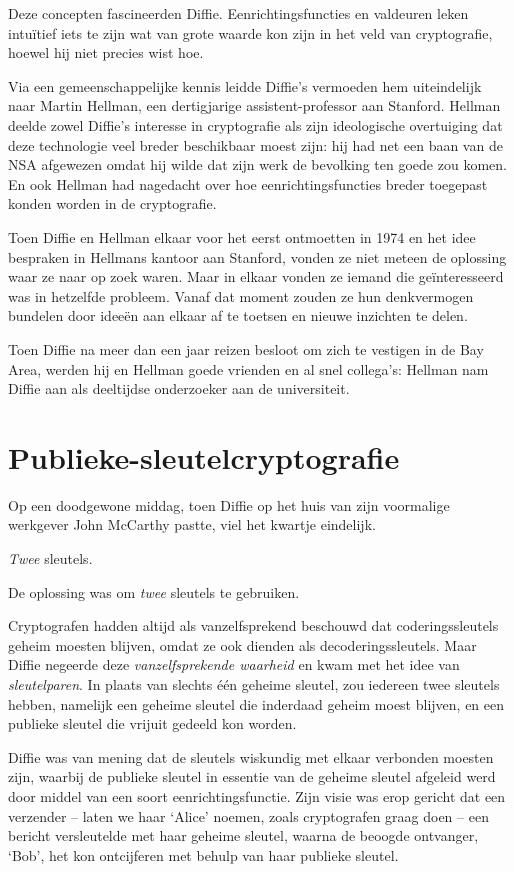 \documentclass[
  a5paper,
  smalldemyvopaper,11pt,twoside,onecolumn,openright,extrafontsizes,
hidelinks]{memoir}
\begin{document}
Deze concepten fascineerden Diffie. Eenrichtingsfuncties en valdeuren
leken intuïtief iets te zijn wat van grote waarde kon zijn in het veld
van cryptografie, hoewel hij niet precies wist hoe.

Via een gemeenschappelijke kennis leidde Diffie's vermoeden hem
uiteindelijk naar Martin Hellman, een dertigjarige assistent-professor
aan Stanford. Hellman deelde zowel Diffie's interesse in cryptografie
als zijn ideologische overtuiging dat deze technologie veel breder
beschikbaar moest zijn: hij had net een baan van de NSA afgewezen omdat
hij wilde dat zijn werk de bevolking ten goede zou komen. En ook Hellman
had nagedacht over hoe eenrichtingsfuncties breder toegepast konden
worden in de cryptografie.

Toen Diffie en Hellman elkaar voor het eerst ontmoetten in 1974 en het
idee bespraken in Hellmans kantoor aan Stanford, vonden ze niet meteen
de oplossing waar ze naar op zoek waren. Maar in elkaar vonden ze iemand
die geïnteresseerd was in hetzelfde probleem. Vanaf dat moment zouden ze
hun denkvermogen bundelen door ideeën aan elkaar af te toetsen en nieuwe
inzichten te delen.

Toen Diffie na meer dan een jaar reizen besloot om zich te vestigen in
de Bay Area, werden hij en Hellman goede vrienden en al snel collega's:
Hellman nam Diffie aan als deeltijdse onderzoeker aan de universiteit.

\section{Publieke-sleutelcryptografie}\label{publieke-sleutelcryptografie}

Op een doodgewone middag, toen Diffie op het huis van zijn voormalige
werkgever John McCarthy pastte, viel het kwartje eindelijk.

\emph{Twee} sleutels.

De oplossing was om \emph{twee} sleutels te gebruiken.

Cryptografen hadden altijd als vanzelfsprekend beschouwd dat
coderingssleutels geheim moesten blijven, omdat ze ook dienden als
decoderingssleutels. Maar Diffie negeerde deze \emph{vanzelfsprekende
waarheid} en kwam met het idee van \emph{sleutelparen}. In plaats van
slechts één geheime sleutel, zou iedereen twee sleutels hebben, namelijk
een geheime sleutel die inderdaad geheim moest blijven, en een publieke
sleutel die vrijuit gedeeld kon worden.

Diffie was van mening dat de sleutels wiskundig met elkaar verbonden
moesten zijn, waarbij de publieke sleutel in essentie van de geheime
sleutel afgeleid werd door middel van een soort eenrichtingsfunctie.
Zijn visie was erop gericht dat een verzender -- laten we haar `Alice'
noemen, zoals cryptografen graag doen -- een bericht versleutelde met
haar geheime sleutel, waarna de beoogde ontvanger, `Bob', het kon
ontcijferen met behulp van haar publieke sleutel.
\end{document}
